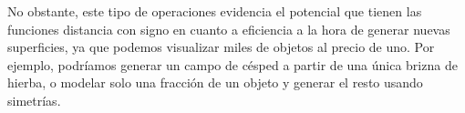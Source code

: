 No obstante, este tipo de operaciones evidencia el potencial que tienen las funciones distancia con signo en cuanto a eficiencia a la hora de generar nuevas superficies, ya que podemos visualizar miles de objetos al precio de uno. Por ejemplo, podríamos generar un campo de césped a partir de una única brizna de hierba, o modelar solo una fracción de un objeto y generar el resto usando simetrías.

